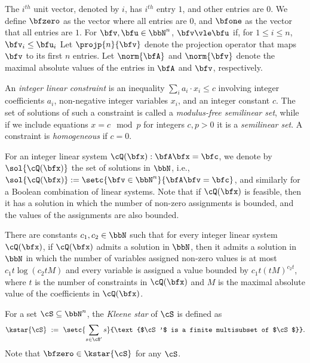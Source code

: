 The $i^{th}$ unit vector, denoted by $\unit{i}$,
has $i^{th}$ entry $1$, and other entries are $0$.
We define $\bfzero$ as the vector where all entries are $0$,
and $\bfone$ as the vector that all entries are $1$.
For  $\bfv, \bfu \in \bbN^n$,
$\bfv \vle \bfu$ if, for $1 \le i \le n$, $\bfv_i \le \bfu_i$
Let $\projp{n}{\bfv}$ denote the projection operator that maps $\bfv$ to its first $n$ entries.
Let $\norm{\bfA}$ and $\norm{\bfv}$ denote the maximal absolute values of the entries in $\bfA$ and $\bfv$, respectively.

An \emph{integer linear constraint} is an inequality $\sum_{i} a_i \cdot x_i \leq c$
involving integer coefficients $a_i$, non-negative integer variables $x_i$, and an integer constant $c$.
The set of solutions of such a constraint is called a \emph{modulus-free semilinear set}, while
if we include equations $x = c \mod p$ for integers $c, p>0$ it is a \emph{semilinear set}.
A constraint is \emph{homogeneous} if $c = 0$.

For an integer linear system $\cQ(\bfx): \bfA \bfx = \bfc$,
we denote by $\sol{\cQ(\bfx)}$ the set of solutions in $\bbN$,
i.e., $\sol{\cQ(\bfx)} := \setc{\bfv \in \bbN^n}{\bfA\bfv = \bfc}$, and similarly for a Boolean combination of linear systems.
Note that if $\cQ(\bfx)$ is feasible,
then it has a solution in which the number of non-zero assignments is bounded, and the values of the assignments are also bounded.

\begin{lemma}\label{lem:ilp}
    There are constants $c_1, c_2 \in \bbN$ such that for every integer linear system $\cQ(\bfx)$,
    if $\cQ(\bfx)$ admits a solution in $\bbN$, then it admits a solution in $\bbN$ in which
    the number of variables assigned non-zero values is at most $c_1t\log\left(c_2tM\right)$ and
    every variable is assigned a value bounded by $c_1t(tM)^{c_2t}$,
    where $t$ is the number of constraints in $\cQ(\bfx)$ and $M$ is the maximal absolute value of the coefficients in $\cQ(\bfx)$.
\end{lemma}



\begin{definition}
    For a set $\cS \subseteq \bbN^n$,
    the \emph{Kleene star} of $\cS$ is defined as
    \begin{equation*}
        \kstar{\cS}\ :=\ \setc{\sum_{s \in \cS'} s}{\text{$\cS'$ is a finite multisubset of $\cS$}}.
    \end{equation*}
    Note that $\bfzero \in \kstar{\cS}$ for any $\cS$.
\end{definition}


